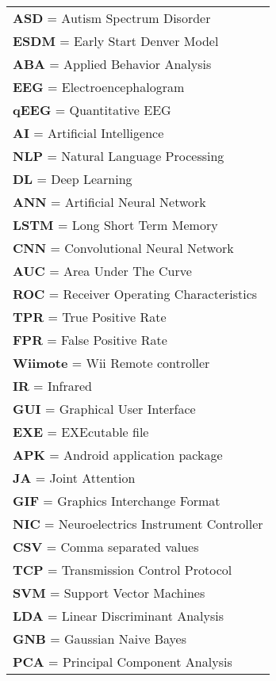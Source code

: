 \newpage
{}

\begin{Listofabbreviations}

\begin{center}
    \begin{tabular}{@{}l@{}}
    \textbf{ASD} = Autism Spectrum Disorder \\
    \textbf{ESDM} = Early Start Denver Model \\
    \textbf{ABA} = Applied Behavior Analysis \\
    \textbf{EEG} = Electroencephalogram \\
    \textbf{qEEG} = Quantitative EEG \\
    \textbf{AI} = Artificial Intelligence \\
    \textbf{NLP} = Natural Language Processing \\
    \textbf{DL} = Deep Learning \\
    \textbf{ANN} = Artificial Neural Network \\
    \textbf{LSTM} = Long Short Term Memory \\
    \textbf{CNN} = Convolutional Neural Network \\
    \textbf{AUC} = Area Under The Curve \\
    \textbf{ROC} = Receiver Operating Characteristics \\
    \textbf{TPR} = True Positive Rate \\
    \textbf{FPR} = False Positive Rate \\
    \textbf{Wiimote} = Wii Remote controller \\
    \textbf{IR} = Infrared \\
    \textbf{GUI} = Graphical User Interface \\
    \textbf{EXE} = EXEcutable file \\
    \textbf{APK} = Android application package \\
    \textbf{JA} = Joint Attention \\
    \textbf{GIF} = Graphics Interchange Format \\
    \textbf{NIC} = Neuroelectrics Instrument Controller \\
    \textbf{CSV} = Comma separated values \\
    \textbf{TCP} = Transmission Control Protocol \\
    \textbf{SVM} = Support Vector Machines \\
    \textbf{LDA} = Linear Discriminant Analysis \\
    \textbf{GNB} = Gaussian Naive Bayes \\
    \textbf{PCA} = Principal Component Analysis \\
    \end{tabular}
\end{center}

\end{Listofabbreviations}